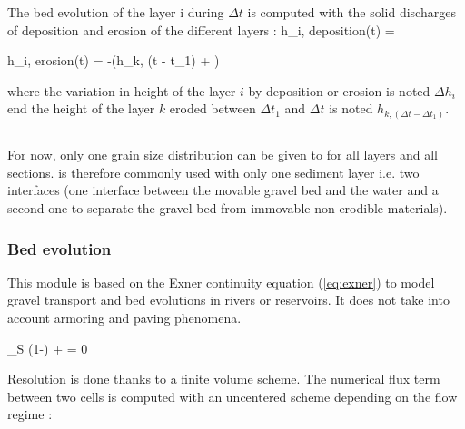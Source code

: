The bed evolution of the layer i during $\Delta t$ is computed with the solid discharges of deposition and erosion of the different layers :
\bequ
    \Delta h_{i, deposition}(\Delta t) = 
\eequ

\bequ
    \Delta h_{i, erosion}(\Delta t)  = -\left(\sum h_{k, (\Delta t - \Delta t_1)} + \right)
\eequ

where the variation in height of the layer $i$ by deposition or erosion is noted $\Delta h_i$ end the height of the layer $k$ eroded between $\Delta t_1$ and $\Delta t$ is noted $h_{k, (\Delta t - \Delta t_1)}$.


\subsection{\Cbedload}
For now, only one grain size distribution can be given to \Cbedload for all layers and all sections. 
\Cbedload is therefore commonly used with only one sediment layer i.e. two interfaces (one interface between the movable gravel bed and the water and a second one to separate the gravel bed from immovable non-erodible materials).
 
\subsubsection{Bed evolution}
 This module is based on the Exner continuity equation (\ref{eq:exner}) to model gravel transport and bed evolutions in rivers or reservoirs. It does not take into account armoring and paving phenomena.

\bequ
     \rho_S (1-\rho)  +  = 0 
     \label{eq:exner}
\eequ

Resolution is done thanks to a finite volume scheme. The numerical flux term between two cells is computed with an uncentered scheme depending on the flow regime \cite{thesis_ung} : 

